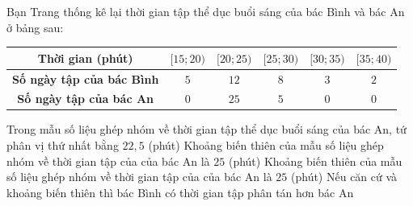 \begin{ex}%

Bạn Trang thống kê lại thời gian tập thể dục buổi sáng của bác Bình và bác An ở bảng sau:
\begin{center}
\begin{tabular}{|c|c|c|c|c|c|}
\hline
\textbf{Thời gian (phút)} & $[15;20)$ & $[20;25)$ & $[25;30)$ & $[30;35)$ & $[35;40)$\\
\hline
\textbf{Số ngày tập của bác Bình} & $5$ & $12$ & $8$ & $3$ & $2$ \\
\hline
\textbf{Số ngày tập của bác An} & $0$ & $25$ & $5$ & $0$ & $0$\\
\hline
\end{tabular}
\end{center}
\choiceTF
{Trong mẫu số liệu ghép nhóm về thời gian tập thể dục buổi sáng của bác An, tứ phân vị thứ nhất bằng $22{,}5$ (phút)}
{\True Khoảng biến thiên của mẫu số liệu ghép nhóm về thời gian tập của của bác An là $25$ (phút)}
{Khoảng biến thiên của mẫu số liệu ghép nhóm về thời gian tập của của bác An là $25$ (phút)}
{\True Nếu căn cứ và khoảng biến thiên thì bác Bình có thời gian tập phân tán hơn bác An}
\end{ex}

